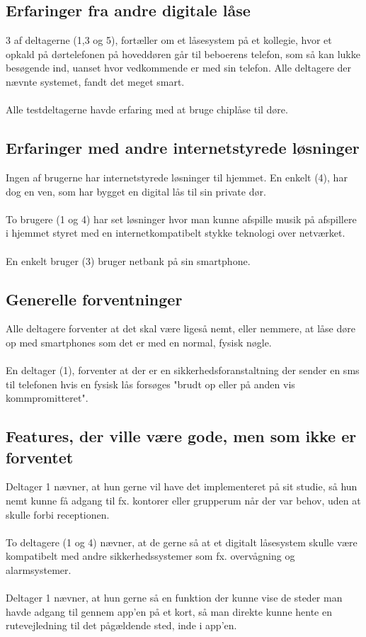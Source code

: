 \documentclass[a4paper,12pt]{article}
\begin{document}
\subsection{Erfaringer fra andre digitale låse}

3 af deltagerne (1,3 og 5), fortæller om et låsesystem på et kollegie, hvor et opkald på dørtelefonen på hoveddøren går til beboerens telefon, som så kan lukke besøgende ind, uanset hvor vedkommende er med sin telefon.
Alle deltagere der nævnte systemet, fandt det meget smart.
\\ \\
Alle testdeltagerne havde erfaring med at bruge chiplåse til døre.


\subsection{Erfaringer med andre internetstyrede løsninger}
Ingen af brugerne har internetstyrede løsninger til hjemmet. En enkelt (4), har dog en ven, som har bygget en digital lås til sin private dør.
\\ \\
To brugere (1 og 4) har set løsninger hvor man kunne afspille musik på afspillere i hjemmet styret med en internetkompatibelt stykke teknologi over netværket.
\\ \\
En enkelt bruger (3) bruger netbank på sin smartphone. 

\subsection{Generelle forventninger}

Alle deltagere forventer at det skal være ligeså nemt, eller nemmere, at låse døre op med smartphones som det er med en normal, fysisk nøgle.
\\ \\
En deltager (1), forventer at der er en sikkerhedsforanstaltning der sender en sms til telefonen hvis en fysisk lås forsøges "brudt op eller på anden vis kommpromitteret".

\subsection{Features, der ville være gode, men som ikke er forventet}
Deltager 1 nævner, at hun gerne vil have det implementeret på sit studie, så hun nemt kunne få adgang til fx. kontorer eller grupperum når der var behov, uden at skulle forbi receptionen.
\\ \\
To deltagere (1 og 4) nævner, at de gerne så at et digitalt låsesystem skulle være kompatibelt med andre sikkerhedssystemer som fx. overvågning og alarmsystemer.
\\ \\
Deltager 1 nævner, at hun gerne så en funktion der kunne vise de steder man havde adgang til gennem app'en på et kort, så man direkte kunne hente en rutevejledning til det pågældende sted, inde i app'en.
\end{document}
